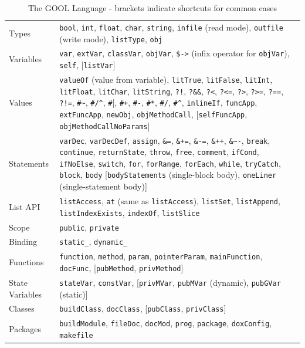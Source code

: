 \documentclass[sigplan,screen,10pt]{acmart}
\begin{document}
\begin{table}[t]
  \caption{The GOOL Language - brackets indicate shortcuts for common cases}
  \begin{tabular}{p{2.2cm}| p{15cm}}
    Types & \verb|bool|, \verb|int|, \verb|float|, \verb|char|, 
    \verb|string|, 
    \verb|infile| (read mode), \verb|outfile| (write mode), 
    \verb|listType|, 
    \verb|obj| \\
    Variables & \verb|var|, \verb|extVar|, \verb|classVar|, \verb|objVar|, 
    \verb|$->| (infix operator for \verb|objVar|), \verb|self|,
    [\verb|listVar|] \\
    Values & \verb|valueOf| (value from variable), \verb|litTrue|, 
    \verb|litFalse|, \verb|litInt|, 
    \verb|litFloat|, \verb|litChar|, \verb|litString|, \verb|?!|, 
    \verb|?&&|, 
    \verb|?<|, \verb|?<=|, \verb|?>|, \verb|?>=|, \verb|?==|, \verb|?!=|, 
    \verb|#~|, \verb|#/^|, \verb|#||, \verb|#+|, \verb|#-|, \verb|#*|, 
    \verb|#/|, \verb|#^|, \verb|inlineIf|, \verb|funcApp|, 
    \verb|extFuncApp|, 
    \verb|newObj|, \verb|objMethodCall|, [\verb|selfFuncApp|, 
    \verb|objMethodCallNoParams|] \\
    Statements & \verb|varDec|, \verb|varDecDef|, \verb|assign|, \verb|&=|, 
    \verb|&+=|, \verb|&-=|, \verb|&++|, \verb|&~-|, \verb|break|, 
    \verb|continue|, \verb|returnState|, \verb|throw|, \verb|free|, 
    \verb|comment|, \verb|ifCond|, \verb|ifNoElse|, \verb|switch|, 
    \verb|for|, 
    \verb|forRange|, \verb|forEach|, \verb|while|, \verb|tryCatch|, 
    \verb|block|, \verb|body| [\verb|bodyStatements| (single-block body), 
    \verb|oneLiner| (single-statement body)] \\
    List API & \verb|listAccess|, \verb|at| (same as \verb|listAccess|), 
    \verb|listSet|, \verb|listAppend|, \verb|listIndexExists|, 
    \verb|indexOf|, \verb|listSlice| \\
    Scope & \verb|public|, \verb|private| \\
    Binding & \verb|static_|, \verb|dynamic_| \\
    Functions & \verb|function|, \verb|method|, \verb|param|, 
    \verb|pointerParam|, \verb|mainFunction|, \verb|docFunc|, 
    [\verb|pubMethod|, \verb|privMethod|] \\
    State Variables & \verb|stateVar|, \verb|constVar|, [\verb|privMVar|, 
    \verb|pubMVar| (dynamic), \verb|pubGVar| (static)]\\
    Classes & \verb|buildClass|, \verb|docClass|, [\verb|pubClass|, 
    \verb|privClass|]\\
    Packages & \verb|buildModule|, \verb|fileDoc|, \verb|docMod|, 
    \verb|prog|, 
    \verb|package|, \verb|doxConfig|, \verb|makefile|
  \end{tabular}
  \label{tab:syntax}
\end{table}
\end{document}
